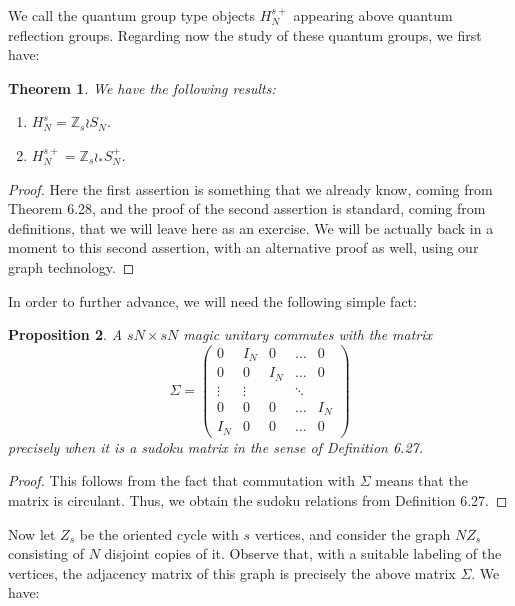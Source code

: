 \documentclass[12pt]{amsbook}
\newtheorem{theorem}{Theorem}[chapter]
\newtheorem{proposition}[theorem]{Proposition}
\begin{document}
We call the quantum group type objects $H_N^{s+}$ appearing above quantum reflection groups. Regarding now the study of these quantum groups, we first have:


\begin{theorem}
We have the following results:
\begin{enumerate}
\item $H_N^s=\mathbb Z_s\wr S_N$.

\item $H_N^{s+}=\mathbb Z_s\wr_*S_N^+$.
\end{enumerate}
\end{theorem}

\begin{proof}
Here the first assertion is something that we already know, coming from Theorem 6.28, and the proof of the second assertion is standard, coming from definitions, that we will leave here as an exercise. We will be actually back in a moment to this second assertion, with an alternative proof as well, using our graph technology.
\end{proof}

In order to further advance, we will need the following simple fact: 

\begin{proposition}
A $sN\times sN$ magic unitary commutes with the matrix
$$\Sigma=
\begin{pmatrix}
0&I_N&0&\ldots&0\\
0&0&I_N&\ldots&0\\
\vdots&\vdots&&\ddots&\\
0&0&0&\ldots&I_N\\
I_N&0&0&\ldots&0
\end{pmatrix}$$
precisely when it is a sudoku matrix in the sense of Definition 6.27.
\end{proposition}

\begin{proof}
This follows from the fact that commutation with $\Sigma$ means that the matrix is circulant. Thus, we obtain the sudoku relations from Definition 6.27.
\end{proof}

Now let $Z_s$ be the oriented cycle with $s$ vertices, and consider the graph $NZ_s$ consisting of $N$ disjoint copies of it. Observe that, with a suitable labeling of the vertices, the adjacency matrix of this graph is precisely the above matrix $\Sigma$. We have:
\end{document}
